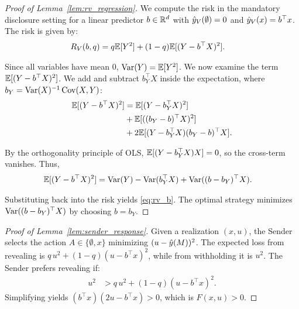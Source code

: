 \begin{proof}[Proof of Lemma~\ref{lem:rv_regression}]
We compute the risk in the mandatory disclosure setting for a linear predictor $b \in \mathbb{R}^d$ with $\hat{y}_V(\emptyset)=0$ and $\hat{y}_V(x) = b^\top x$. The risk is given by:
\begin{align*}
  R_V(b, q) &= q \mathbb{E}[Y^2] + (1-q) \mathbb{E}[(Y - b^\top X)^2].
\end{align*}

Since all variables have mean $0$, $\operatorname{Var}(Y) = \mathbb{E}[Y^2]$. We now examine the term $\mathbb{E}[(Y-b^\top X)^2]$. We add and subtract $b_Y^\top X$ inside the expectation, where $b_Y = \operatorname{Var}(X)^{-1}\operatorname{Cov}(X,Y)$:
\begin{align*}
  \mathbb{E}[(Y - b^\top X)^2] &= \mathbb{E}[(Y - b_Y^\top X)^2] \\
  &+ \mathbb{E}[((b_Y - b)^\top X)^2] \\
  &+ 2\mathbb{E}[(Y - b_Y^\top X)(b_Y - b)^\top X].
\end{align*}

By the orthogonality principle of OLS, $\mathbb{E}[(Y - b_Y^\top X)X] = 0$, so the cross-term vanishes. Thus,
\begin{align*}
  \mathbb{E}[(Y - b^\top X)^2] &= \operatorname{Var}(Y) - \operatorname{Var}(b_Y^\top X) + \operatorname{Var}((b-b_Y)^\top X).
\end{align*}

Substituting back into the risk yields \eqref{eq:rv_b}. The optimal strategy minimizes $\operatorname{Var}((b-b_Y)^\top X)$ by choosing $b = b_Y$.
\end{proof}

\begin{proof}[Proof of Lemma~\ref{lem:sender_response}]
Given a realization $(x, u)$, the Sender selects the action $A \in \{\emptyset, x\}$ minimizing $(u - \hat{y}(M))^2$. The expected loss from revealing is $q\,u^2 + (1-q)(u - b^\top x)^2$, while from withholding it is $u^2$. The Sender prefers revealing if:
\begin{align*}
  u^2 &> q\,u^2 + (1-q)(u - b^\top x)^2.
\end{align*}
Simplifying yields $(b^\top x)(2u - b^\top x) > 0$, which is $F(x,u) > 0$.
\end{proof}

